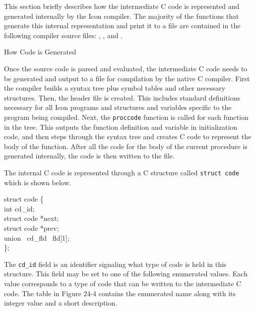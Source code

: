 This section briefly describes how the intermediate C code is
represented and generated internally by the Icon compiler.  The
majority of the functions that generate this internal representation
and print it to a file are contained in the following compiler source
files: , , and .

{\sffamily
How Code is Generated}

Once the source code is parsed and evaluated, the intermediate C code
needs to be generated and output to a file for compilation by the
native C compiler. First the compiler builds a syntax tree plus symbol
tables and other necessary structures. Then, the header file is
created. This includes standard definitions necessary for all Icon
programs and structures and variables specific to the program being
compiled. Next, the \texttt{proccode} function is called for each
function in the tree. This outputs the function definition and
variable in initialization code, and then steps through the syntax
tree and creates C code to represent the body of the function. After
all the code for the body of the current procedure is generated
internally, the code is then written to the file.

The internal C code is represented through a C structure called
\texttt{struct code} which is shown below.

\goodbreak
\begin{iconcode}
struct code \{\\
\>int cd\_id;\\
\>struct code *next;\\
\>struct code *prev;\\
\>union \ cd\_fld \ fld[1];\\
\};\\
\end{iconcode}


The \texttt{cd\_id} field is an identifier signaling what type of code
is held in this structure. This field may be set to one of the
following enumerated values. Each value corresponds to a type of code
that can be written to the intermediate C code. The table in Figure
24-4 contains the enumerated name along with its integer value and a
short description.

